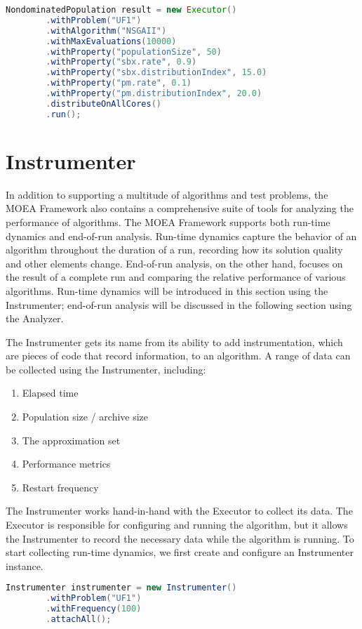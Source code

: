 \begin{lstlisting}[language=Java]
NondominatedPopulation result = new Executor()
		.withProblem("UF1")
		.withAlgorithm("NSGAII")
		.withMaxEvaluations(10000)
		.withProperty("populationSize", 50)
		.withProperty("sbx.rate", 0.9)
		.withProperty("sbx.distributionIndex", 15.0)
		.withProperty("pm.rate", 0.1)
		.withProperty("pm.distributionIndex", 20.0)
		.distributeOnAllCores()
		.run();
\end{lstlisting}

\section{Instrumenter}
In addition to supporting a multitude of algorithms and test problems, the MOEA Framework also contains a comprehensive suite of tools for analyzing the performance of algorithms.  The MOEA Framework supports both run-time dynamics and end-of-run analysis.  Run-time dynamics capture the behavior of an algorithm throughout the duration of a run, recording how its solution quality and other elements change.  End-of-run analysis, on the other hand, focuses on the result of a complete run and comparing the relative performance of various algorithms.  Run-time dynamics will be introduced in this section using the Instrumenter; end-of-run analysis will be discussed in the following section using the Analyzer.

The Instrumenter gets its name from its ability to add instrumentation, which are pieces of code that record information, to an algorithm.  A range of data can be collected using the Instrumenter, including:

\begin{enumerate}
  \item Elapsed time
  \item Population size / archive size
  \item The approximation set
  \item Performance metrics
  \item Restart frequency
\end{enumerate}

The Instrumenter works hand-in-hand with the Executor to collect its data.  The Executor is responsible for configuring and running the algorithm, but it allows the Instrumenter to record the necessary data while the algorithm is running.  To start collecting run-time dynamics, we first create and configure an Instrumenter instance.

\begin{lstlisting}[language=Java]
Instrumenter instrumenter = new Instrumenter()
		.withProblem("UF1")
		.withFrequency(100)
		.attachAll();
\end{lstlisting}

